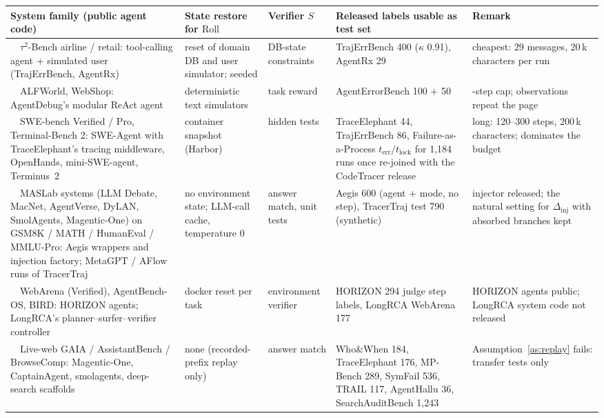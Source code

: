 \medskip\noindent\begin{minipage}{\linewidth}\centering\scriptsize
\setlength{\tabcolsep}{3pt}
\begin{tabularx}{\linewidth}{@{}>{\RaggedRight\hsize=1.15\hsize}X >{\RaggedRight\hsize=0.8\hsize}X >{\RaggedRight\hsize=0.65\hsize}X >{\RaggedRight\hsize=1.2\hsize}X >{\RaggedRight\hsize=1.2\hsize}X@{}}\toprule
System family (public agent code) & State restore for $\mathrm{Roll}$ & Verifier $S$ & Released labels usable as test set & Remark \\\midrule
1\ \ $\tau^2$-Bench airline / retail: tool-calling agent + simulated user (TrajErrBench, AgentRx) & reset of domain DB and user simulator; seeded & DB-state constraints & TrajErrBench 400 ($\kappa$ 0.91), AgentRx 29 & cheapest: 29 messages, 20\,k characters per run \\
2\ \ ALFWorld, WebShop: AgentDebug's modular ReAct agent & deterministic text simulators & task reward & AgentErrorBench 100 + 50 & 30-step cap; observations repeat the page \\
3\ \ SWE-bench Verified / Pro, Terminal-Bench 2: SWE-Agent with TraceElephant's tracing middleware, OpenHands, mini-SWE-agent, Terminus~2 & container snapshot (Harbor) & hidden tests & TraceElephant 44, TrajErrBench 86, Failure-as-a-Process $t_{\mathrm{err}}/t_{\mathrm{lock}}$ for 1,184 runs once re-joined with the CodeTracer release & long: 120--300 steps, 200\,k characters; dominates the budget \\
4\ \ MASLab systems (LLM Debate, MacNet, AgentVerse, DyLAN, SmolAgents, Magentic-One) on GSM8K / MATH / HumanEval / MMLU-Pro: Aegis wrappers and injection factory; MetaGPT / AFlow runs of TracerTraj & no environment state; LLM-call cache, temperature 0 & answer match, unit tests & Aegis 600 (agent + mode, no step), TracerTraj test 790 (synthetic) & injector released; the natural setting for $\Delta_{\mathrm{inj}}$ with absorbed branches kept \\
5\ \ WebArena (Verified), AgentBench-OS, BIRD: HORIZON agents; LongRCA's planner--surfer--verifier controller & docker reset per task & environment verifier & HORIZON 294 judge step labels, LongRCA WebArena 177 & HORIZON agents public; LongRCA system code not released \\
6\ \ Live-web GAIA / AssistantBench / BrowseComp: Magentic-One, CaptainAgent, smolagents, deep-search scaffolds & none (recorded-prefix replay only) & answer match & Who\&When 184, TraceElephant 176, MP-Bench 289, SymFail 536, TRAIL 117, AgentHallu 36, SearchAuditBench 1,243 & Assumption~\ref{as:replay} fails: transfer tests only \\\bottomrule
\end{tabularx}
\label{tab:engine}
\end{minipage}\medskip



